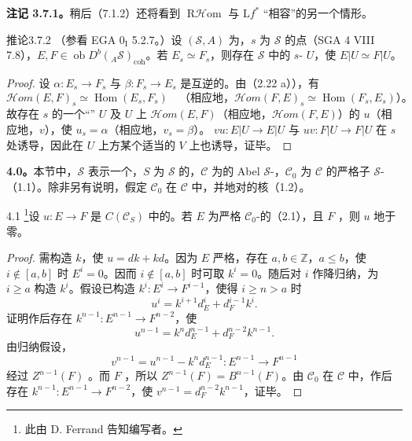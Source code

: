 \textbf{注记 3.7.1。}稍后（7.1.2）还将看到 $\operatorname{R\mathcal Hom}$ 与 $\mathrm Lf^*$ “相容”的另一个情形。

\begin{SGAresult}{推论}{3.7.2}
（参看 EGA $0_{\mathrm I}$ 5.2.7。）设 $(\mathscr S,A)$ 为，$s$ 为 $\mathscr S$ 的点（SGA 4 VIII 7.8），$E,F\in\operatorname{ob}D^b({}_A\mathscr S)_{\mathrm{coh}}$。若 $E_s\simeq F_s$，则存在 $\mathscr S$ 中的 $s$- $U$，使 $E|U\simeq F|U$。
\end{SGAresult}
\begin{proof}
设 $\alpha:E_s\to F_s$ 与 $\beta:F_s\to E_s$ 是互逆的。由（2.22 a）），有
\[
\mathcal Hom(E,F)_s\simeq\operatorname{Hom}(E_s,F_s)
\quad\text{（相应地，}\mathcal Hom(F,E)_s\simeq\operatorname{Hom}(F_s,E_s)\text{）。}
\]
故存在 $s$ 的一个“” $U$ 及 $U$ 上 $\mathcal Hom(E,F)$（相应地，$\mathcal Hom(F,E)$）的 $u$（相应地，$v$），使 $u_s=\alpha$（相应地，$v_s=\beta$）。 $vu:E|U\to E|U$ 与 $uv:F|U\to F|U$ 在 $s$ 处诱导，因此在 $U$ 上方某个适当的 $V$ 上也诱导，证毕。
\end{proof}

\textbf{4.0。}本节中，$\mathscr S$ 表示一个，$S$ 为 $\mathscr S$ 的，$\mathcal C$ 为的 Abel $\mathscr S$-，$\mathcal C_0$ 为 $\mathcal C$ 的严格子 $\mathscr S$-（1.1）。除非另有说明，假定 $\mathcal C_0$ 在 $\mathcal C$ 中，并地对的核（1.2）。

\begin{SGAresult}{}{4.1}
\footnote{此由 D. Ferrand 告知编写者。}设 $u:E\to F$ 是 $C(\mathcal C_S)$ 中的。若 $E$ 为严格 $\mathcal C_0$-的（2.1），且 $F$ ，则 $u$ 地于零。
\end{SGAresult}
\begin{proof}
需构造 $k$，使 $u=dk+kd$。因为 $E$ 严格，存在 $a,b\in\mathbb Z$，$a\leq b$，使 $i\notin[a,b]$ 时 $E^i=0$。因而 $i\notin[a,b]$ 时可取 $k^i=0$。随后对 $i$ 作降归纳，为 $i\geq a$ 构造 $k^i$。假设已构造 $k^i:E^i\to F^{i-1}$，使得 $i\geq n>a$ 时
\[u^i=k^{i+1}d_E^i+d_F^{i-1}k^i.\]
证明作后存在 $k^{n-1}:E^{n-1}\to F^{n-2}$，使
\[u^{n-1}=k^nd_E^{n-1}+d_F^{n-2}k^{n-1}.\]
由归纳假设，
\[v^{n-1}=u^{n-1}-k^nd_E^{n-1}:E^{n-1}\longrightarrow F^{n-1}\]
经过 $Z^{n-1}(F)$ 。而 $F$ ，所以 $Z^{n-1}(F)=B^{n-1}(F)$。由 $\mathcal C_0$ 在 $\mathcal C$ 中，作后存在 $k^{n-1}:E^{n-1}\to F^{n-2}$，使 $v^{n-1}=d_F^{n-2}k^{n-1}$，证毕。
\end{proof}

